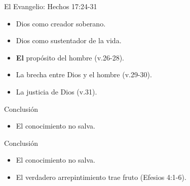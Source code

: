 \documentclass[17pt, aspectratio=169]{beamer}
\begin{document}
\begin{frame}{El Evangelio: Hechos 17:24-31}
    \begin{itemize}
        \item Dios como creador soberano.
        \item Dios como sustentador de la vida.
        \item \textbf{El} propósito del hombre (v.26-28).
        \item La brecha entre Dios y el hombre (v.29-30).
        \item La justicia de Dios (v.31).
    \end{itemize}
\end{frame}

\begin{frame}{Conclusi\'on}
    \begin{itemize}
        \item El conocimiento no salva.
    \end{itemize}
\end{frame}

\begin{frame}{Conclusi\'on}
    \begin{itemize}
        \item El conocimiento no salva.
        \item El verdadero arrepintimiento trae fruto (Efesios 4:1-6).
    \end{itemize}
\end{frame}
\end{document}
